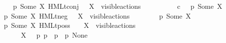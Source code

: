 \begin{isabellebody}
\ \ \isanewline
\ \ {\isacharbar}{\kern0pt}\ {\isacartoucheopen}{\isacharparenleft}{\kern0pt}p\ {\isasymTTurnstile}{\isacharquery}{\kern0pt}{\isacharbrackleft}{\kern0pt}Some\ X{\isacharbrackright}{\kern0pt}\ {\isacharparenleft}{\kern0pt}HMLt{\isacharunderscore}{\kern0pt}conj\ {\isasymPhi}{\isacharparenright}{\kern0pt}{\isacharparenright}{\kern0pt}\ {\isacharequal}{\kern0pt}\ {\isacharparenleft}{\kern0pt}X\ {\isasymsubseteq}\ visible{\isacharunderscore}{\kern0pt}actions\ {\isasymand}\isanewline
\ \ \ \ \ \ {\isacharparenleft}{\kern0pt}{\isasymforall}\ {\isasymphi}{\isachardot}{\kern0pt}\ {\isasymphi}\ {\isasymin}\isactrlsub c\ {\isasymPhi}\ {\isasymlongrightarrow}\ p\ {\isasymTTurnstile}{\isacharquery}{\kern0pt}{\isacharbrackleft}{\kern0pt}Some\ X{\isacharbrackright}{\kern0pt}\ {\isasymphi}{\isacharparenright}{\kern0pt}{\isacharparenright}{\kern0pt}{\isacartoucheclose}\ \isanewline
\ \ {\isacharbar}{\kern0pt}\ {\isacartoucheopen}{\isacharparenleft}{\kern0pt}p\ {\isasymTTurnstile}{\isacharquery}{\kern0pt}{\isacharbrackleft}{\kern0pt}Some\ X{\isacharbrackright}{\kern0pt}\ {\isacharparenleft}{\kern0pt}HMLt{\isacharunderscore}{\kern0pt}neg\ {\isasymphi}{\isacharparenright}{\kern0pt}{\isacharparenright}{\kern0pt}\ {\isacharequal}{\kern0pt}\ {\isacharparenleft}{\kern0pt}X\ {\isasymsubseteq}\ visible{\isacharunderscore}{\kern0pt}actions\ {\isasymand}\isanewline
\ \ \ \ \ \ {\isacharparenleft}{\kern0pt}{\isasymnot}\ p\ {\isasymTTurnstile}{\isacharquery}{\kern0pt}{\isacharbrackleft}{\kern0pt}Some\ X{\isacharbrackright}{\kern0pt}\ {\isasymphi}{\isacharparenright}{\kern0pt}{\isacharparenright}{\kern0pt}{\isacartoucheclose}\ \isanewline
\ \ {\isacharbar}{\kern0pt}\ {\isacartoucheopen}{\isacharparenleft}{\kern0pt}p\ {\isasymTTurnstile}{\isacharquery}{\kern0pt}{\isacharbrackleft}{\kern0pt}Some\ X{\isacharbrackright}{\kern0pt}\ {\isacharparenleft}{\kern0pt}HMLt{\isacharunderscore}{\kern0pt}poss\ {\isasymalpha}\ {\isasymphi}{\isacharparenright}{\kern0pt}{\isacharparenright}{\kern0pt}\ {\isacharequal}{\kern0pt}\ {\isacharparenleft}{\kern0pt}X\ {\isasymsubseteq}\ visible{\isacharunderscore}{\kern0pt}actions\ {\isasymand}\isanewline
\ \ \ \ \ \ {\isacharparenleft}{\kern0pt}{\isacharparenleft}{\kern0pt}{\isacharparenleft}{\kern0pt}{\isasymalpha}\ {\isasymin}\ X{\isacharparenright}{\kern0pt}\ {\isasymand}\ {\isacharparenleft}{\kern0pt}{\isasymexists}\ p{\isacharprime}{\kern0pt}{\isachardot}{\kern0pt}\ p\ {\isasymlongmapsto}{\isasymalpha}\ p{\isacharprime}{\kern0pt}\ {\isasymand}\ p{\isacharprime}{\kern0pt}\ {\isasymTTurnstile}{\isacharquery}{\kern0pt}{\isacharbrackleft}{\kern0pt}None{\isacharbrackright}{\kern0pt}\ {\isasymphi}{\isacharparenright}{\kern0pt}{\isacharparenright}{\kern0pt}\ {\isasymor}\ \isanewline

\end{isabellebody}
